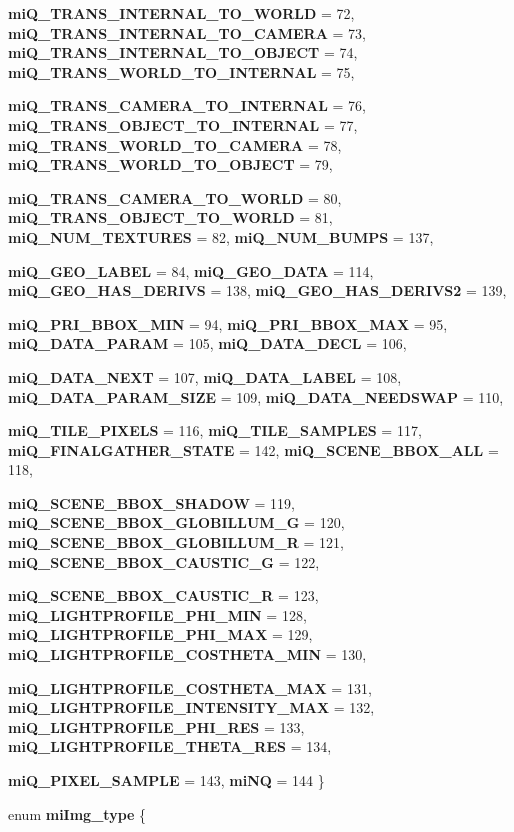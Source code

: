 \begin{CompactItemize}
\par
{\bf mi\-Q\_\-TRANS\_\-INTERNAL\_\-TO\_\-WORLD} =  72, 
{\bf mi\-Q\_\-TRANS\_\-INTERNAL\_\-TO\_\-CAMERA} =  73, 
{\bf mi\-Q\_\-TRANS\_\-INTERNAL\_\-TO\_\-OBJECT} =  74, 
{\bf mi\-Q\_\-TRANS\_\-WORLD\_\-TO\_\-INTERNAL} =  75, 
\par
{\bf mi\-Q\_\-TRANS\_\-CAMERA\_\-TO\_\-INTERNAL} =  76, 
{\bf mi\-Q\_\-TRANS\_\-OBJECT\_\-TO\_\-INTERNAL} =  77, 
{\bf mi\-Q\_\-TRANS\_\-WORLD\_\-TO\_\-CAMERA} =  78, 
{\bf mi\-Q\_\-TRANS\_\-WORLD\_\-TO\_\-OBJECT} =  79, 
\par
{\bf mi\-Q\_\-TRANS\_\-CAMERA\_\-TO\_\-WORLD} =  80, 
{\bf mi\-Q\_\-TRANS\_\-OBJECT\_\-TO\_\-WORLD} =  81, 
{\bf mi\-Q\_\-NUM\_\-TEXTURES} =  82, 
{\bf mi\-Q\_\-NUM\_\-BUMPS} =  137, 
\par
{\bf mi\-Q\_\-GEO\_\-LABEL} =  84, 
{\bf mi\-Q\_\-GEO\_\-DATA} =  114, 
{\bf mi\-Q\_\-GEO\_\-HAS\_\-DERIVS} =  138, 
{\bf mi\-Q\_\-GEO\_\-HAS\_\-DERIVS2} =  139, 
\par
{\bf mi\-Q\_\-PRI\_\-BBOX\_\-MIN} =  94, 
{\bf mi\-Q\_\-PRI\_\-BBOX\_\-MAX} =  95, 
{\bf mi\-Q\_\-DATA\_\-PARAM} =  105, 
{\bf mi\-Q\_\-DATA\_\-DECL} =  106, 
\par
{\bf mi\-Q\_\-DATA\_\-NEXT} =  107, 
{\bf mi\-Q\_\-DATA\_\-LABEL} =  108, 
{\bf mi\-Q\_\-DATA\_\-PARAM\_\-SIZE} =  109, 
{\bf mi\-Q\_\-DATA\_\-NEEDSWAP} =  110, 
\par
{\bf mi\-Q\_\-TILE\_\-PIXELS} =  116, 
{\bf mi\-Q\_\-TILE\_\-SAMPLES} =  117, 
{\bf mi\-Q\_\-FINALGATHER\_\-STATE} =  142, 
{\bf mi\-Q\_\-SCENE\_\-BBOX\_\-ALL} =  118, 
\par
{\bf mi\-Q\_\-SCENE\_\-BBOX\_\-SHADOW} =  119, 
{\bf mi\-Q\_\-SCENE\_\-BBOX\_\-GLOBILLUM\_\-G} =  120, 
{\bf mi\-Q\_\-SCENE\_\-BBOX\_\-GLOBILLUM\_\-R} =  121, 
{\bf mi\-Q\_\-SCENE\_\-BBOX\_\-CAUSTIC\_\-G} =  122, 
\par
{\bf mi\-Q\_\-SCENE\_\-BBOX\_\-CAUSTIC\_\-R} =  123, 
{\bf mi\-Q\_\-LIGHTPROFILE\_\-PHI\_\-MIN} =  128, 
{\bf mi\-Q\_\-LIGHTPROFILE\_\-PHI\_\-MAX} =  129, 
{\bf mi\-Q\_\-LIGHTPROFILE\_\-COSTHETA\_\-MIN} =  130, 
\par
{\bf mi\-Q\_\-LIGHTPROFILE\_\-COSTHETA\_\-MAX} =  131, 
{\bf mi\-Q\_\-LIGHTPROFILE\_\-INTENSITY\_\-MAX} =  132, 
{\bf mi\-Q\_\-LIGHTPROFILE\_\-PHI\_\-RES} =  133, 
{\bf mi\-Q\_\-LIGHTPROFILE\_\-THETA\_\-RES} =  134, 
\par
{\bf mi\-Q\_\-PIXEL\_\-SAMPLE} =  143, 
{\bf mi\-NQ} =  144
 \}
\item 
enum {\bf mi\-Img\_\-type} \{ \par

\end{CompactItemize}
